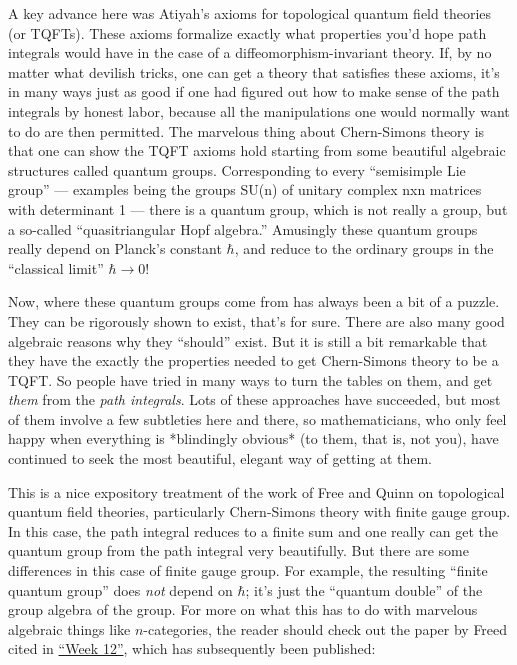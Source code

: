 \documentclass{article}
\def\tightlist{}
\renewcommand{\texttt}[1]{%
  \begingroup
  \ttfamily
  \begingroup\lccode`~=`/\lowercase{\endgroup\def~}{/\discretionary{}{}{}}%
  \begingroup\lccode`~=`[\lowercase{\endgroup\def~}{[\discretionary{}{}{}}%
  \begingroup\lccode`~=`.\lowercase{\endgroup\def~}{.\discretionary{}{}{}}%
  \catcode`/=\active\catcode`[=\active\catcode`.=\active
  \scantokens{#1\noexpand}%
  \endgroup
}
\begin{document}
A key advance here was Atiyah's axioms for topological quantum field
theories (or TQFTs). These axioms formalize exactly what properties
you'd hope path integrals would have in the case of a
diffeomorphism-invariant theory. If, by no matter what devilish tricks,
one can get a theory that satisfies these axioms, it's in many ways just
as good if one had figured out how to make sense of the path integrals
by honest labor, because all the manipulations one would normally want
to do are then permitted. The marvelous thing about Chern-Simons theory
is that one can show the TQFT axioms hold starting from some beautiful
algebraic structures called quantum groups. Corresponding to every
``semisimple Lie group'' --- examples being the groups SU(n) of unitary
complex nxn matrices with determinant 1 --- there is a quantum group,
which is not really a group, but a so-called ``quasitriangular Hopf
algebra.'' Amusingly these quantum groups really depend on Planck's
constant \(\hbar\), and reduce to the ordinary groups in the ``classical
limit'' \(\hbar \to 0\)!

Now, where these quantum groups come from has always been a bit of a
puzzle. They can be rigorously shown to exist, that's for sure. There
are also many good algebraic reasons why they ``should'' exist. But it
is still a bit remarkable that they have the exactly the properties
needed to get Chern-Simons theory to be a TQFT. So people have tried in
many ways to turn the tables on them, and get \emph{them} from the
\emph{path integrals}. Lots of these approaches have succeeded, but most
of them involve a few subtleties here and there, so mathematicians, who
only feel happy when everything is *blindingly obvious* (to them, that
is, not you), have continued to seek the most beautiful, elegant way of
getting at them.


This is a nice expository treatment of the work of Free and Quinn on
topological quantum field theories, particularly Chern-Simons theory
with finite gauge group. In this case, the path integral reduces to a
finite sum and one really can get the quantum group from the path
integral very beautifully. But there are some differences in this case
of finite gauge group. For example, the resulting ``finite quantum
group'' does \emph{not} depend on \(\hbar\); it's just the ``quantum
double'' of the group algebra of the group. For more on what this has to
do with marvelous algebraic things like \(n\)-categories, the reader
should check out the paper by Freed cited in
\protect\hyperlink{week12}{``Week 12''}, which has subsequently been
published:
\end{document}
